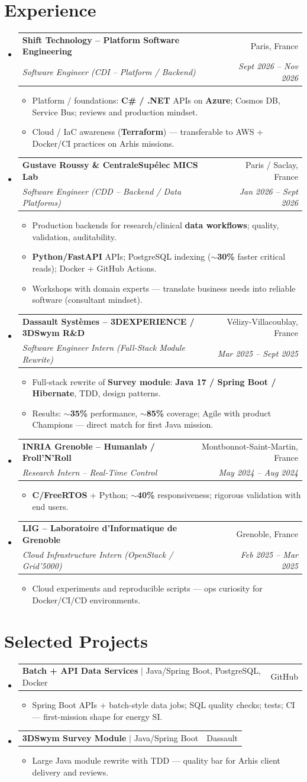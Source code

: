 \documentclass[letterpaper,10.5pt]{article}
\makeatletter
\newcommand{\resumeItem}[1]{\item\small{#1 \vspace{-1.5pt}}}
\newcommand{\resumeSubheading}[4]{\vspace{-1pt}\item\begin{tabular*}{0.97\textwidth}[t]{l@{\extracolsep{\fill}}r}\textbf{#1} & #2 \\\textit{\small#3} & \textit{\small #4} \\\end{tabular*}\vspace{-5pt}}
\newcommand{\resumeProjectHeading}[2]{\item\begin{tabular*}{0.97\textwidth}{l@{\extracolsep{\fill}}r}\small#1 & #2 \\\end{tabular*}\vspace{-5pt}}
\newcommand{\resumeSubHeadingListStart}{\begin{itemize}[leftmargin=0.15in, label={}]}
\newcommand{\resumeSubHeadingListEnd}{\end{itemize}}
\newcommand{\resumeItemListStart}{\begin{itemize}[leftmargin=0.18in]}
\newcommand{\resumeItemListEnd}{\end{itemize}\vspace{-3pt}}
\makeatother
\begin{document}
\section{Experience}
\resumeSubHeadingListStart
  \resumeSubheading
    {Shift Technology -- Platform Software Engineering}{Paris, France}
    {Software Engineer (CDI -- Platform / Backend)}{Sept 2026 -- Nov 2026}
    \resumeItemListStart
      \resumeItem{Platform / foundations: \textbf{C\# / .NET} APIs on \textbf{Azure}; Cosmos DB, Service Bus; reviews and production mindset.}
      \resumeItem{Cloud / IaC awareness (\textbf{Terraform}) --- transferable to AWS + Docker/CI practices on Arhis missions.}
    \resumeItemListEnd
  \resumeSubheading
    {Gustave Roussy \& CentraleSup\'elec MICS Lab}{Paris / Saclay, France}
    {Software Engineer (CDD -- Backend / Data Platforms)}{Jan 2026 -- Sept 2026}
    \resumeItemListStart
      \resumeItem{Production backends for research/clinical \textbf{data workflows}; quality, validation, auditability.}
      \resumeItem{\textbf{Python/FastAPI} APIs; PostgreSQL indexing (\textbf{$\sim$30\%} faster critical reads); Docker + GitHub Actions.}
      \resumeItem{Workshops with domain experts --- translate business needs into reliable software (consultant mindset).}
    \resumeItemListEnd
  \resumeSubheading
    {Dassault Syst\`emes -- 3DEXPERIENCE / 3DSwym R\&D}{V\'elizy-Villacoublay, France}
    {Software Engineer Intern (Full-Stack Module Rewrite)}{Mar 2025 -- Sept 2025}
    \resumeItemListStart
      \resumeItem{Full-stack rewrite of \textbf{Survey module}: \textbf{Java 17 / Spring Boot / Hibernate}, TDD, design patterns.}
      \resumeItem{Results: \textbf{$\sim$35\%} performance, \textbf{$\sim$85\%} coverage; Agile with product Champions --- direct match for first Java mission.}
    \resumeItemListEnd
  \resumeSubheading
    {INRIA Grenoble -- Humanlab / Froll'N'Roll}{Montbonnot-Saint-Martin, France}
    {Research Intern -- Real-Time Control}{May 2024 -- Aug 2024}
    \resumeItemListStart
      \resumeItem{\textbf{C/FreeRTOS} + Python; \textbf{$\sim$40\%} responsiveness; rigorous validation with end users.}
    \resumeItemListEnd
  \resumeSubheading
    {LIG -- Laboratoire d'Informatique de Grenoble}{Grenoble, France}
    {Cloud Infrastructure Intern (OpenStack / Grid'5000)}{Feb 2025 -- Mar 2025}
    \resumeItemListStart
      \resumeItem{Cloud experiments and reproducible scripts --- ops curiosity for Docker/CI/CD environments.}
    \resumeItemListEnd
\resumeSubHeadingListEnd
\section{Selected Projects}
\resumeSubHeadingListStart
  \resumeProjectHeading{\textbf{Batch + API Data Services} $|$ Java/Spring Boot, PostgreSQL, Docker}{GitHub}
    \resumeItemListStart
      \resumeItem{Spring Boot APIs + batch-style data jobs; SQL quality checks; tests; CI --- first-mission shape for energy SI.}
    \resumeItemListEnd
  \resumeProjectHeading{\textbf{3DSwym Survey Module} $|$ Java/Spring Boot}{Dassault}
    \resumeItemListStart
      \resumeItem{Large Java module rewrite with TDD --- quality bar for Arhis client delivery and reviews.}
    \resumeItemListEnd
\resumeSubHeadingListEnd
\end{document}
